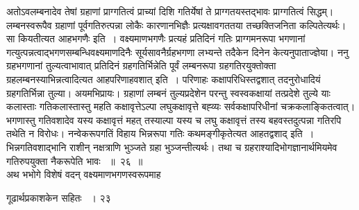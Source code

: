 \documentclass[11pt, openany]{book}
\begin{document}
\begin{sloppypar}
 अतोऽवलम्बनादेव तेषां ग्रहाणां प्राग्गतित्वं प्राच्यां दिशि गतिर्येषां ते प्राग्गतयस्तद्भावः प्राग्गतित्वं सिद्धम्। लम्बनस्वरूपैव ग्रहाणां पूर्वगतिरुत्पन्ना लोकैः कारणानभिज्ञैः प्रत्यक्षावगततया तच्छक्तिजनिता कल्पितेत्यर्थः। सा कियतीत्यत आह\textendash भगणैः इति~। वक्ष्यमाणभगणैः प्रत्यहं प्रतिदिनं गतिः प्राग्गमनरूपा भगणानां गत्युत्पन्नत्वाद्भगणसम्बन्धिवक्ष्यमाणदिनैः सूर्यसावनैर्ग्रहभगणा लभ्यन्ते तदैकेन दिनेन केत्यनुपाताज्ज्ञेया। ननु ग्रहभगणानां तुल्यत्वाभावात् प्रतिदिनं ग्रहगतिर्भिन्नेति पूर्वं लम्बनरूपा ग्रहगतिरयुक्तोक्ता ग्रहलम्बनस्याभिन्नत्वादित्यत आह\textendash परिणाहवशात् इति~। परिणाहः कक्षापरिधिस्तद्वशात् तदनुरोधादियं ग्रहगतिर्भिन्ना तुल्या। अयमभिप्रायः। ग्रहाणां लम्बनं तुल्यप्रदेशेन परन्तु स्वस्वकक्षायां तत्प्रदेशे तुल्ये याः कलास्ताः गतिकलास्तास्तु महति कक्षावृत्तेऽल्पा लघुकक्षावृत्ते बह्व्यः सर्वकक्षापरिधीनां चक्रकलाङ्कितत्वात्। भगणास्तु गतिवशादेव यस्य कक्षावृत्तं महत् तस्याल्पा यस्य च लघु कक्षावृत्तं तस्य बहवस्तदुत्पन्ना गतिरपि तथेति न विरोधः। नन्वेकरूपगतिं विहाय भिन्नरूपा गतिः कथमङ्गीकृतेत्यत आह\textendash तद्वशाद् इति~। भिन्नगतिवशाद्भानि राशीन् नक्षत्राणि भुञ्जते ग्रहा भुञ्जन्तीत्यर्थः। तथा च ग्रहराश्यादिभोगज्ञानार्थमियमेव गतिरुपयुक्ता नैकरूपेति भावः ~॥~२६~॥\\ 
 \noindent अथ भभोगे विशेषं वदन् वक्ष्यमाणभगणस्वरूपमाह\textendash
\end{sloppypar}
\newpage

\hspace{3cm} गूढार्थप्रकाशकेन सहितः ~। \hfill २३
\vspace{1cm}
 
\end{document}
